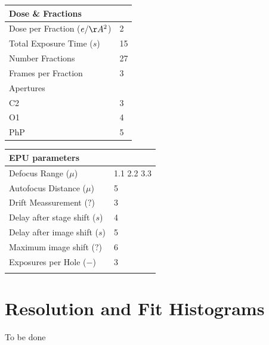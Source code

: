 \documentclass[12pt,a4paper]{article}
\begin{document}
   \newline
%
\begin{tabulary}{\linewidth}{L L}
  \\\hline
  Dose \& Fractions &  \\\hline
  Dose per Fraction ($e/\AA^2$) & 
      2 \\\hline
  Total Exposure Time ($s$)& 
      15 \\\hline
  Number Fractions & 
      27 \\\hline
  Frames per Fraction & 
      3\\\hline
  Apertures &  \\\hline
  C2  & 3 \\\hline
  O1  & 4 \\\hline
  PhP & 5 \\\hline
\end{tabulary}
%
  \hspace{1cm}
%
\begin{tabulary}{\linewidth}{L L}
  \\\hline
  EPU parameters &  \\\hline
  Defocus Range ($\mu$)& 1.1 2.2 3.3 \\\hline
  Autofocus Distance ($\mu$) & 
      5 \\\hline
  Drift Meassurement ($?$) & 
      3 \\\hline
  Delay after stage shift ($s$) & 
      4 \\\hline
  Delay after image shift ($s$) &
      5 \\\hline
  Maximum image shift ($?$) &
      6 \\\hline
  Exposures per Hole ($-$)& 
      3 \\\hline
      &\\
\end{tabulary}

\newpage\thispagestyle{empty}
\section*{Resolution and Fit Histograms}

To be done


\end{document}
